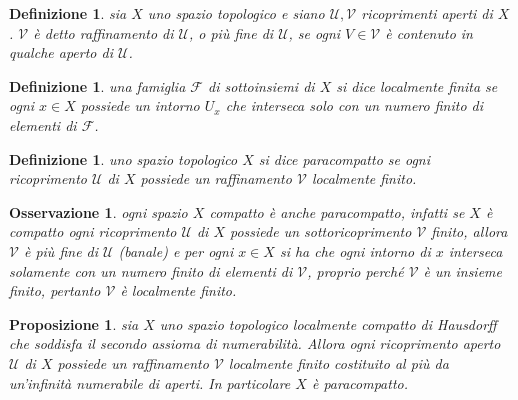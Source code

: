 \documentclass[oneside, 11pt]{amsbook}
\newcommand{\0}{{(0)}}
\newcommand{\3}{{(3)}}
\theoremstyle{colonplain}
\newtheorem{prop}[thm]{Proposizione}
\theoremstyle{colondefinition}
\newtheorem{defn}[thm]{Definizione}
\theoremstyle{colonremark}
\newtheorem{rmk}[thm]{Osservazione}
\numberwithin{equation}{chapter}
\begin{document}
\begin{defn}
sia $X$ uno spazio topologico e siano $\mathcal{U}, \mathcal{V}$ ricoprimenti aperti di $X$. $\mathcal{V}$ è detto \textit{raffinamento} di $\mathcal{U}$, o \textit{più fine} di $\mathcal{U}$, se ogni $V \in \mathcal{V}$ è contenuto in qualche aperto di $\mathcal{U}$.
\end{defn}
\begin{defn}
una famiglia $\mathcal{F}$ di sottoinsiemi di $X$ si dice \textit{localmente finita} se ogni $x \in X$ possiede un intorno $U_x$ che interseca solo con un numero finito di elementi di $\mathcal{F}$.
\end{defn}
\begin{defn}
uno spazio topologico $X$ si dice \textit{paracompatto} se ogni ricoprimento $\mathcal{U}$ di $X$ possiede un raffinamento $\mathcal{V}$ localmente finito.
\end{defn}
\begin{rmk}
ogni spazio $X$ compatto è anche paracompatto, infatti se $X$ è compatto ogni ricoprimento $\mathcal{U}$ di $X$ possiede un sottoricoprimento $\mathcal{V}$ finito, allora $\mathcal{V}$ è più fine di $\mathcal{U}$ (banale) e per ogni $x \in X$ si ha che ogni intorno di $x$ interseca solamente con un numero finito di elementi di $\mathcal{V}$, proprio perché $\mathcal{V}$ è un insieme finito, pertanto $\mathcal{V}$ è localmente finito.
\end{rmk}
\begin{prop}
sia $X$ uno spazio topologico localmente compatto di Hausdorff che soddisfa il secondo assioma di numerabilità. Allora ogni ricoprimento aperto $\mathcal{U}$ di $X$ possiede un raffinamento $\mathcal{V}$ localmente finito costituito al più da un'infinità numerabile di aperti. In particolare $X$ è paracompatto.
\end{prop}
\end{document}
